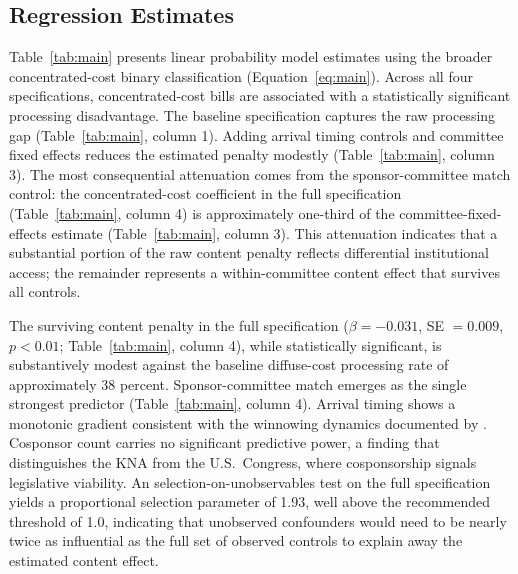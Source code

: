 \documentclass[11pt]{article}
\begin{document}
\subsection{Regression Estimates}

Table~\ref{tab:main} presents linear probability model estimates using the broader concentrated-cost binary classification (Equation~\ref{eq:main}). Across all four specifications, concentrated-cost bills are associated with a statistically significant processing disadvantage. The baseline specification captures the raw processing gap (Table~\ref{tab:main}, column 1). Adding arrival timing controls and committee fixed effects reduces the estimated penalty modestly (Table~\ref{tab:main}, column 3). The most consequential attenuation comes from the sponsor-committee match control: the concentrated-cost coefficient in the full specification (Table~\ref{tab:main}, column 4) is approximately one-third of the committee-fixed-effects estimate (Table~\ref{tab:main}, column 3). This attenuation indicates that a substantial portion of the raw content penalty reflects differential institutional access; the remainder represents a within-committee content effect that survives all controls.

The surviving content penalty in the full specification ($\beta = -0.031$, SE $= 0.009$, $p < 0.01$; Table~\ref{tab:main}, column 4), while statistically significant, is substantively modest against the baseline diffuse-cost processing rate of approximately 38 percent. Sponsor-committee match emerges as the single strongest predictor (Table~\ref{tab:main}, column 4). Arrival timing shows a monotonic gradient consistent with the winnowing dynamics documented by \citet{krutz2005}. Cosponsor count carries no significant predictive power, a finding that distinguishes the KNA from the U.S.\ Congress, where cosponsorship signals legislative viability. An \citet{oster2019} selection-on-unobservables test on the full specification yields a proportional selection parameter of 1.93, well above the recommended threshold of 1.0, indicating that unobserved confounders would need to be nearly twice as influential as the full set of observed controls to explain away the estimated content effect.
\end{document}
